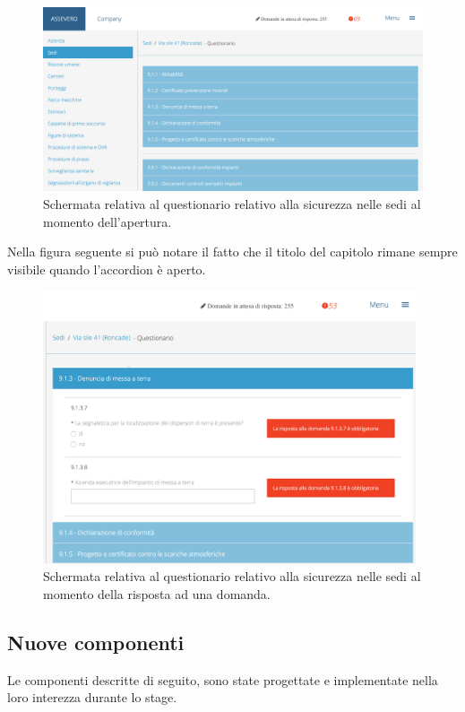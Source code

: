\begin{figure}[H]
	\begin{center}
		\includegraphics[width=13cm]{Pics/ScreenQuestionarioSediApertura.png}
		\caption{Schermata relativa al questionario relativo alla sicurezza nelle sedi al momento dell'apertura.}
		\label{fig:ScreenQuestionarioSediApertura.png}
	\end{center}
\end{figure}
Nella figura seguente si può notare il fatto che il titolo del capitolo rimane sempre visibile quando l'accordion è aperto.\\
\begin{figure}[H]
	\begin{center}
		\includegraphics[width=11cm]{Pics/ScreenQuestionarioStickyHeader.png}
		\caption{Schermata relativa al questionario relativo alla sicurezza nelle sedi al momento della risposta ad una domanda.}
		\label{fig:ScreenQuestionarioStickyHeader.png}
	\end{center}
\end{figure}

 


\newpage
\subsection{Nuove componenti}
Le componenti descritte di seguito, sono state progettate e implementate nella loro interezza durante lo stage.\\

